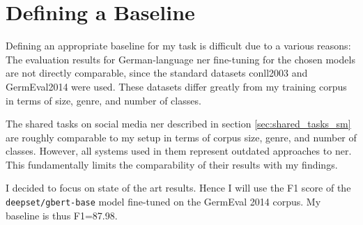 \section{Defining a Baseline}
\label{baseline}
Defining an appropriate baseline for my task is difficult due to a various reasons: The evaluation results for German-language \gls{ner} fine-tuning for the chosen models are not directly comparable, since the standard datasets \gls{conll}2003 and GermEval2014 were used. These datasets differ greatly from my training corpus in terms of size, genre, and number of classes. 


The shared tasks on social media \gls{ner} described in section \ref{sec:shared_tasks_sm} are roughly comparable to my setup in terms of corpus size, genre, and number of classes. However, all systems used in them represent outdated approaches to \gls{ner}. This fundamentally limits the comparability of their results with my findings. 

I decided to focus on state of the art results. Hence I will use the F1 score of the \verb|deepset/gbert-base| model fine-tuned on the GermEval 2014 corpus. My baseline is thus F1=87.98.






